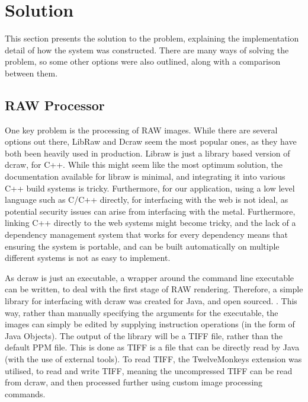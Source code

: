 \documentclass[10pt,a4paper]{article}
\begin{document}
\section{Solution}
This section presents the solution to the problem, explaining the implementation detail of how the system was constructed. There are many ways 
of solving the problem, so some other options were also outlined, along with a comparison between them.

\subsection{RAW Processor}
One key problem is the processing of RAW images. While there are several options out there, LibRaw and Dcraw seem the most popular ones, 
as they have both been heavily used in production. Libraw is just a library based version of dcraw, for C++. While this might seem like the most optimum
solution, the documentation available for libraw is minimal, and integrating it into various C++ build systems is tricky. Furthermore, for our application,
using a low level language such as C/C++ directly, for interfacing with the web is not ideal, as potential security issues can arise from interfacing with the
metal. Furthermore, linking C++ directly to the web systems might become tricky, and the lack of a dependency management system that works for every dependency
means that ensuring the system is portable, and can be built automatically on multiple different systems is not as easy to implement.

As dcraw is just an executable, a wrapper around the command line executable can be written, to deal with the first stage of RAW rendering.
Therefore, a simple library for interfacing with dcraw was created for Java, and open sourced. \cite{JDCRAW}. This way, rather than manually
specifying the arguments for the executable, the images can simply be edited by supplying instruction operations (in the form of Java Objects).
The output of the library will be a TIFF file, rather than the default PPM file. This is done as TIFF is a file that can be directly read by
Java (with the use of external tools). To read TIFF, the TwelveMonkeys extension \cite{TwelveMonkeys} was utilised, to read and write TIFF, meaning
the uncompressed TIFF can be read from dcraw, and then processed further using custom image processing commands. 
\end{document}
